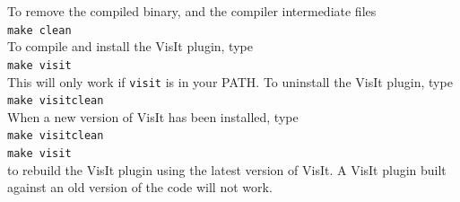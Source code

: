 \documentclass[11pt]{article}
\begin{document}
To remove the compiled binary, and the compiler intermediate files\\
\texttt{make clean}\\
To compile and install the VisIt plugin, type\\
\texttt{make visit}\\
This will only work if \texttt{visit} is in your PATH. To uninstall the VisIt plugin, type\\
\texttt{make visitclean}\\
When a new version of VisIt has been installed, type\\
\texttt{make visitclean}\\
\texttt{make visit}\\
to rebuild the VisIt plugin using the latest version of VisIt. A VisIt plugin built against an old version of the code will not work.
\end{document}

